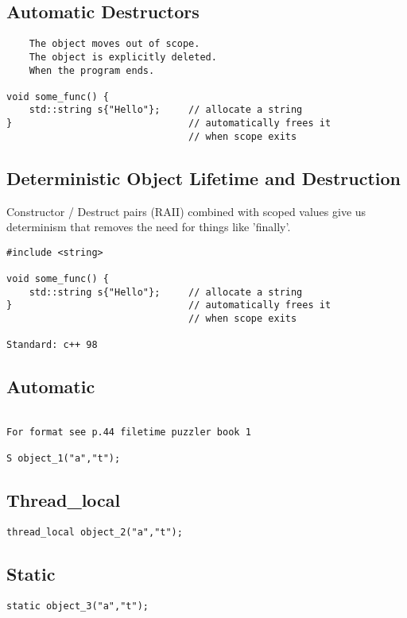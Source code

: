 \subsection{Automatic Destructors}

\begin{verbatim}
    The object moves out of scope.
    The object is explicitly deleted.
    When the program ends.

void some_func() {
    std::string s{"Hello"};     // allocate a string
}                               // automatically frees it
                                // when scope exits
\end{verbatim}

\subsection{Deterministic Object Lifetime and Destruction}

Constructor / Destruct pairs (RAII) combined with scoped values give us determinism
that removes the need for things like 'finally'.

\begin{verbatim}
#include <string>

void some_func() {
    std::string s{"Hello"};     // allocate a string
}                               // automatically frees it
                                // when scope exits

Standard: c++ 98
\end{verbatim}


\subsection{Automatic}
\begin{verbatim}

For format see p.44 filetime puzzler book 1

S object_1("a","t");
\end{verbatim}

\subsection{Thread\_local}
\begin{verbatim}
thread_local object_2("a","t");
\end{verbatim}

\subsection{Static}
\begin{verbatim}
static object_3("a","t");
\end{verbatim}

